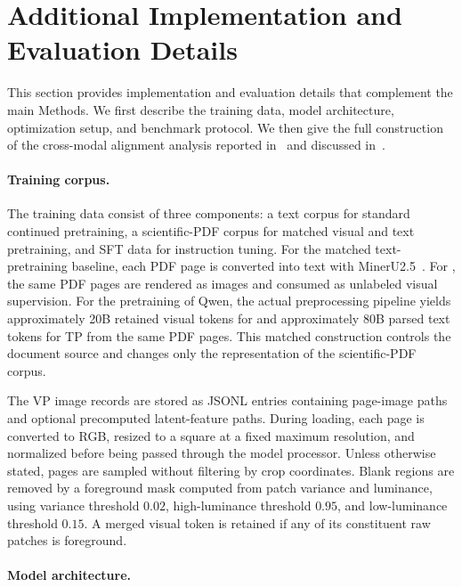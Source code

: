 \section{Additional Implementation and Evaluation Details}
\label{sec:appendix_details}

This section provides implementation and evaluation details that complement the main Methods. We first describe the training data, model architecture, optimization setup, and benchmark protocol. We then give the full construction of the cross-modal alignment analysis reported in~ and discussed in~.

\paragraph{Training corpus.}
\label{sec:appendix_corpus}

The training data consist of three components: a text corpus for standard continued pretraining, a scientific-PDF corpus for matched visual and text pretraining, and SFT data for instruction tuning. For the matched text-pretraining baseline, each PDF page is converted into text with MinerU2.5~\citep{wang2024mineru}. For \methodname, the same PDF pages are rendered as images and consumed as unlabeled visual supervision.
For the pretraining of Qwen, the actual preprocessing pipeline yields approximately 20B retained visual tokens for \methodname and approximately 80B parsed text tokens for TP from the same PDF pages. This matched construction controls the document source and changes only the representation of the scientific-PDF corpus.

The VP image records are stored as JSONL entries containing page-image paths and optional precomputed latent-feature paths. 
During loading, each page is converted to RGB, resized to a square at a fixed maximum resolution, and normalized before being passed through the model processor. Unless otherwise stated, pages are sampled without filtering by crop coordinates. Blank regions are removed by a foreground mask computed from patch variance and luminance, using variance threshold $0.02$, high-luminance threshold $0.95$, and low-luminance threshold $0.15$. A merged visual token is retained if any of its constituent raw patches is foreground.

\paragraph{Model architecture.}
\label{sec:appendix_architecture}

